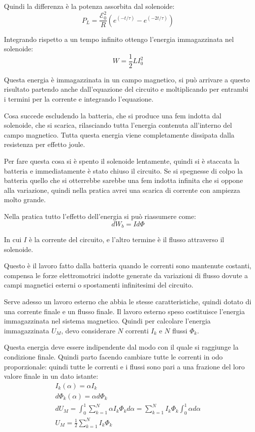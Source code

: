 \documentclass[a4paper]{scrarticle}
\begin{document}
Quindi la differenza è la potenza assorbita dal solenoide:
\begin{equation*}
    P_L = \frac{\mathcal{E_0^2}}{R} (e^{(-t/\tau)} - e^{(-2t/\tau)})
\end{equation*}

Integrando rispetto a un tempo infinito ottengo l'energia immagazzinata nel solenoide:
\begin{equation}
    W = \frac{1}{2} L I_0^2
\end{equation}

Questa energia è immagazzinata in un campo magnetico, si può arrivare a questo risultato partendo anche dall'equazione del circuito e moltiplicando per entrambi i termini per la corrente e integrando l'equazione.

Cosa succede escludendo la batteria, che si produce una fem indotta dal solenoide, che si scarica, rilasciando tutta l'energia contenuta all'interno del campo magnetico.
Tutta questa energia viene completamente dissipata dalla resistenza per effetto joule.

Per fare questa cosa si è spento il solenoide lentamente, quindi si è staccata la batteria e immediatamente è stato chiuso il circuito. Se si spegnesse di colpo la batteria quello che si otterrebbe sarebbe una fem indotta infinita che si oppone alla variazione, quindi nella pratica avrei una scarica di corrente con ampiezza molto grande.

Nella pratica tutto l'effetto dell'energia si può riassumere come:
\begin{equation*}
    dW_b = I d\varPhi
\end{equation*}

In cui $I$ è la corrente del circuito, e l'altro termine è il flusso attraverso il solenoide.

Questo è il lavoro fatto  dalla batteria quando le correnti sono mantenute costanti, compensa le forze elettromotrici indotte generate da variazioni di flusso dovute a campi magnetici esterni o spostamenti infinitesimi del circuito.

Serve adesso un lavoro esterno che abbia le stesse caratteristiche, quindi dotato di una corrente finale e un flusso finale. Il lavoro esterno speso costituisce l'energia immagazzinata nel sistema magnetico.
Quindi per calcolare l'energia immagazzinata $U_M$, devo considerare $N$ correnti $I_k$ e $N$ flussi $\varPhi_k$.

Questa energia deve essere indipendente dal modo con il quale si raggiunge la condizione finale. Quindi parto facendo cambiare tutte le correnti in odo proporzionale: quindi tutte le correnti e i flussi sono pari a una frazione del loro valore finale in un dato istante:
\begin{gather*}
    I_k(\alpha) = \alpha I_k\\
    d\varPhi_k (\alpha) = \alpha d\varPhi_k\\
    dU_M = \int_{0}^{1} \sum_{k=1}^{N} \alpha I_k \varPhi_k d\alpha = \sum_{k=1}^{N}I_k \varPhi_k \int_{0}^{1} \alpha d \alpha\\
    U_M = \frac{1}{2} \sum_{k=1}^{N}I_k \varPhi_k
\end{gather*}
\end{document}
